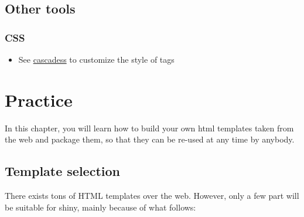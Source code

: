 \documentclass[]{book}
\newenvironment{Shaded}{\begin{snugshade}}{\end{snugshade}}
\newcommand{\DataTypeTok}[1]{\textcolor[rgb]{0.13,0.29,0.53}{#1}}
\newcommand{\KeywordTok}[1]{\textcolor[rgb]{0.13,0.29,0.53}{\textbf{#1}}}
\newcommand{\NormalTok}[1]{#1}
\newcommand{\OperatorTok}[1]{\textcolor[rgb]{0.81,0.36,0.00}{\textbf{#1}}}
\newcommand{\StringTok}[1]{\textcolor[rgb]{0.31,0.60,0.02}{#1}}
\providecommand{\tightlist}{%
  \setlength{\itemsep}{0pt}\setlength{\parskip}{0pt}}
\begin{document}
\hypertarget{htmltools-other-tools}{%
\chapter{Other tools}\label{htmltools-other-tools}}

\hypertarget{css}{%
\section{CSS}\label{css}}

\begin{itemize}
\tightlist
\item
  See \href{https://github.com/nteetor/cascadess}{cascadess} to customize the style of tags
\end{itemize}

\begin{Shaded}
\end{Shaded}

\hypertarget{part-practice}{%
\part*{Practice}\label{part-practice}}

In this chapter, you will learn how to build your own html templates taken from the web and package them, so that they can be re-used at any time by anybody.

\hypertarget{custom-templates-selection}{%
\chapter{Template selection}\label{custom-templates-selection}}

There exists tons of HTML templates over the web. However, only a few part will be suitable for shiny, mainly because of what follows:
\end{document}
